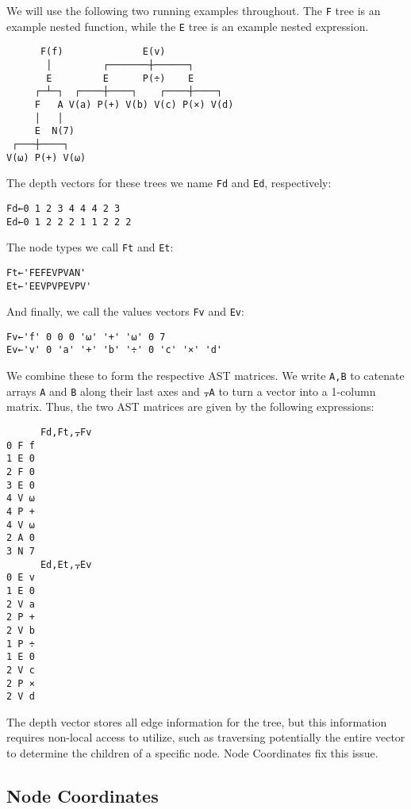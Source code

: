 \documentclass[numbers,preprint]{sigplanconf}
\begin{document}
We will use the following two running examples throughout. The \verb;F; 
tree is an example nested function, while the \verb;E; tree is an example 
nested expression.

\begin{verbatim}
      F(f)              E(v)
       │         ┌───────┼──────┐
       E         E      P(÷)    E
     ┌─┴─┐  ┌────┼────┐    ┌────┼────┐
     F   A V(a) P(+) V(b) V(c) P(×) V(d)
     │   │
     E  N(7) 
 ┌───┼────┐
V(⍵) P(+) V(⍵)
\end{verbatim}

\noindent
The depth vectors for these trees we name \verb;Fd; and \verb;Ed;, respectively:

\begin{verbatim}
Fd←0 1 2 3 4 4 4 2 3
Ed←0 1 2 2 2 1 1 2 2 2
\end{verbatim}

\noindent
The node types we call \verb;Ft; and \verb;Et;:

\begin{verbatim}
Ft←'FEFEVPVAN'
Et←'EEVPVPEVPV'
\end{verbatim}

\noindent
And finally, we call the values vectors \verb;Fv; and \verb;Ev;:

\begin{verbatim}
Fv←'f' 0 0 0 '⍵' '+' '⍵' 0 7
Ev←'v' 0 'a' '+' 'b' '÷' 0 'c' '×' 'd'
\end{verbatim}

\noindent
We combine these to form the respective AST matrices. We write \verb;A,B;
to catenate arrays \verb;A; and \verb;B; along their last axes and \verb;⍪A; to turn a
vector into a 1-column matrix. Thus, the two AST matrices are given
by the following expressions:

\begin{verbatim}
      Fd,Ft,⍪Fv
0 F f
1 E 0
2 F 0
3 E 0
4 V ⍵
4 P +
4 V ⍵
2 A 0
3 N 7
      Ed,Et,⍪Ev
0 E v
1 E 0
2 V a
2 P +
2 V b
1 P ÷
1 E 0
2 V c
2 P ×
2 V d
\end{verbatim}

\noindent
The depth vector stores all edge information for the tree, but this information 
requires non-local access to utilize, such as traversing potentially the 
entire vector to determine the children of a specific node.
Node Coordinates fix this issue.

\subsection{Node Coordinates}
\end{document}
